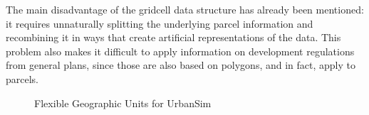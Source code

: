 
The main disadvantage of the gridcell data structure has already been mentioned: it requires unnaturally splitting the underlying parcel information and
recombining it in ways that create artificial representations of the data.  This problem also makes it difficult to apply information on development regulations
from general plans, since those are also based on polygons, and in fact, apply to parcels.

\begin{figure}
\centering
{}
\hspace{1cm}
\hspace{1cm}
\caption{Flexible Geographic Units for UrbanSim}
\label{fig:flexible-geographies} %
\end{figure}




